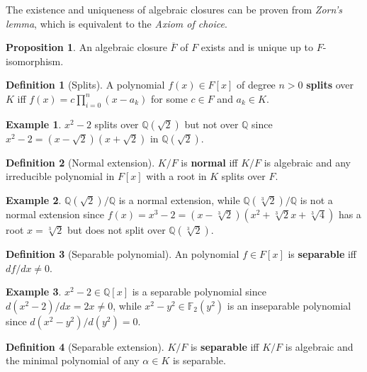 \documentclass{article}
\newcommand{\F}{\mathbb{F}}
\newcommand{\Q}{\mathbb{Q}}
\newcommand{\rb}[1]{\left( #1 \right)}
\renewcommand{\sb}[1]{\left[ #1 \right]}
\theoremstyle{definition}
\newtheorem*{definition}{Definition}
\newtheorem*{example}{Example}
\newtheorem{proposition}{Proposition}[subsection]
\begin{document}
The existence and uniqueness of algebraic closures can be proven from \emph{Zorn's lemma}, which is equivalent to the \emph{Axiom of choice}.

\begin{proposition}
An algebraic closure $ \overline{F} $ of $ F $ exists and is unique up to $ F $-isomorphism.
\end{proposition}

\begin{definition}[Splits]
A polynomial $ f\rb{x} \in F\sb{x} $ of degree $ n > 0 $ \textbf{splits} over $ K $ iff $ f\rb{x} = c\prod_{i = 0}^n \rb{x - a_k} $ for some $ c \in F $ and $ a_k \in K $.
\end{definition}

\begin{example}
$ x^2 - 2 $ splits over $ \Q\rb{\sqrt{2}} $ but not over $ \Q $ since $ x^2 - 2 = \rb{x - \sqrt{2}}\rb{x + \sqrt{2}} $ in $ \Q\rb{\sqrt{2}} $.
\end{example}

\begin{definition}[Normal extension]
$ K / F $ is \textbf{normal} iff $ K / F $ is algebraic and any irreducible polynomial in $ F\sb{x} $ with a root in $ K $ splits over $ F $.
\end{definition}

\begin{example}
$ \Q\rb{\sqrt{2}} / \Q $ is a normal extension, while $ \Q\rb{\sqrt[3]{2}} / \Q $ is not a normal extension since $ f\rb{x} = x^3 - 2 = \rb{x - \sqrt[3]{2}} \rb{x^2 + \sqrt[3]{2}x + \sqrt[3]{4}} $ has a root $ x = \sqrt[3]{2} $ but does not split over $ \Q\rb{\sqrt[3]{2}} $.
\end{example}

\begin{definition}[Separable polynomial]
An polynomial $ f \in F\sb{x} $ is \textbf{separable} iff $ df / dx \ne 0 $.
\end{definition}

\begin{example}
$ x^2 - 2 \in \Q\sb{x} $ is a separable polynomial since $ d\rb{x^2 - 2} / dx = 2x \ne 0 $, while $ x^2 - y^2 \in \F_2\rb{y^2} $ is an inseparable polynomial since $ d\rb{x^2 - y^2} / d\rb{y^2} = 0 $.
\end{example}

\begin{definition}[Separable extension]
$ K / F $ is \textbf{separable} iff $ K / F $ is algebraic and the minimal polynomial of any $ \alpha \in K $ is separable.
\end{definition}
\end{document}
